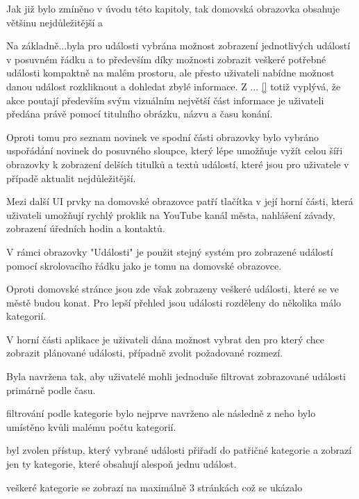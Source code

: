 \pagebreak
\begin{minipage}[t]{0.45\textwidth}
  Jak již bylo zmíněno v úvodu této kapitoly, tak domovská obrazovka obsahuje většinu nejdůležitější a 
  
  Na základně...byla pro události vybrána možnost zobrazení jednotlivých událostí v posuvném řádku a to především díky možnosti zobrazit
  veškeré potřebné události kompaktně na malém prostoru, ale přesto uživateli nabídne možnost danou událost rozkliknout a dohledat zbylé informace.
  Z ... \ref{} totiž vyplývá, že akce poutají především svým vizuálním největší část informace je uživateli předána právě pomocí titulního obrázku, názvu
  a času konání.
  
  Oproti tomu pro seznam novinek ve spodní části obrazovky bylo vybráno uspořádání novinek do posuvného sloupce, který lépe umožňuje 
  vyžít celou šíři obrazovky k zobrazení delších titulků a textů událostí, které jsou pro uživatele v případě aktualit nejdůležitější.
  
  Mezi další UI prvky na domovské obrazovce patří tlačítka v její horní části, která uživateli umožňují rychlý proklik na YouTube kanál města,
  nahlášení závady, zobrazení úředních hodin a kontaktů.
  
  
  
  \bigskip
  V rámci obrazovky "Události" je použit stejný systém pro zobrazené událostí pomocí skrolovacího řádku jako je tomu na domovské obrazovce.
  
  Oproti domovské stránce jsou zde však zobrazeny veškeré události, které se ve městě budou konat. Pro lepší přehled jsou události rozděleny 
  do několika málo kategorií.
  
  V horní části aplikace je uživateli dána možnost vybrat den pro který chce zobrazit plánované události, případně zvolit požadované rozmezí.
  
  
  
  Byla navržena tak, aby uživatelé mohli jednoduše filtrovat zobrazované události primárně podle času.
  
  filtrování podle kategorie bylo nejprve navrženo ale následně z neho bylo umístěno kvůli malému počtu kategorií.
  
  byl zvolen přístup, který vybrané události přiřadí do patřičné kategorie a zobrazí jen ty kategorie, které obsahují alespoň jednu událost.
  
  veškeré kategorie se zobrazí na maximálně 3 stránkách což se ukázalo
\end{minipage}
